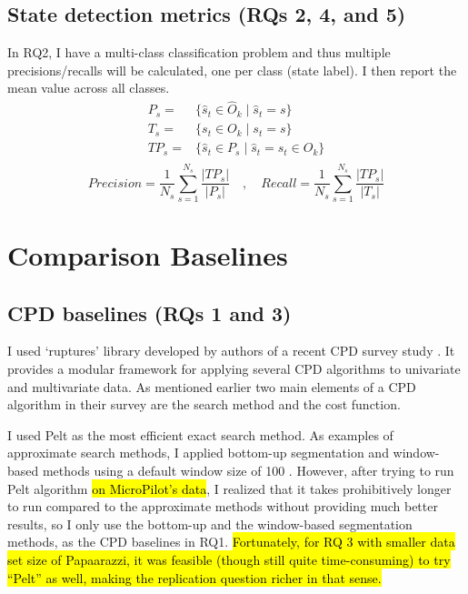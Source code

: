 \subsection{State detection metrics (RQs 2, 4, and 5)}
In RQ2, I have a multi-class classification problem and thus multiple precisions/recalls will be calculated, one per class (state label). I then report the mean value across all classes.
\begin{equation}
\begin{split}
P_s ={}&{}\big\{\hat{s}_t \in \hat{O}_k \;\big|\; \hat{s}_t = s\big\} \\
T_s ={}&{}\big\{s_t \in O_k \;\big|\; s_t = s\big\} \\
TP_s ={}&{}\big\{\hat{s}_t \in P_s \;\big|\; \hat{s}_t = s_t \in O_k\big\} \\
\end{split}
\end{equation}
$$Precision =\frac{1}{N_s}\sum_{s=1}^{N_s} \frac{|TP_s|}{|P_s|} \quad,\quad Recall = \frac{1}{N_s}\sum_{s=1}^{N_s} \frac{|TP_s|}{|T_s|}$$

\section{Comparison Baselines} 
\subsection{CPD baselines (RQs 1 and 3)} \label{sec:CPD_baseline}
I used `ruptures' library developed by authors of a recent CPD survey study \cite{Truong2018ChangePointSurvey}. It provides a modular framework for applying several CPD algorithms to univariate and multivariate data. %
As mentioned earlier two main elements of a CPD algorithm in their survey are the search method and the cost function.

I used Pelt \cite{killick2012optimal} as the most efficient exact search method. As examples of approximate search methods, I applied bottom-up segmentation and window-based methods using a default window size of 100 \cite{keogh2001online}.
However, after trying to run Pelt algorithm \hl{on MicroPilot's data}, I realized that it takes prohibitively longer to run compared to the approximate methods without providing much better results, so I only use the bottom-up and the window-based segmentation methods, as the CPD baselines in RQ1.
\hl{Fortunately, for RQ 3 with smaller data set size of Papaarazzi, it was feasible (though still quite time-consuming) to try ``Pelt'' as well, making the replication question richer in that sense.}

